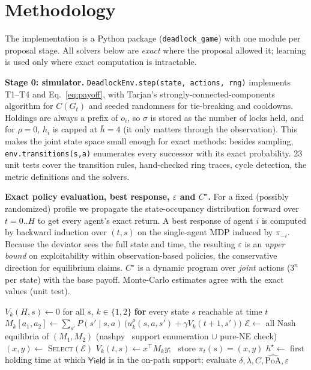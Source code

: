 \documentclass[10pt]{article}
\newcommand{\PoAhat}{\widehat{\mathrm{PoA}}}
\newcommand{\Yield}{\textsf{Yield}}
\begin{document}
\section{Methodology}\label{sec:method}
The implementation is a Python package (\texttt{deadlock\_game}) with one module per proposal stage. All solvers below
are \emph{exact} where the proposal allowed it; learning is used only where exact computation is intractable.

\textbf{Stage 0: simulator.} \texttt{DeadlockEnv.step(state, actions, rng)} implements T1--T4 and Eq.~\eqref{eq:payoff},
with Tarjan's strongly-connected-components algorithm for $C(G_t)$ and seeded randomness for tie-breaking and cooldowns.
Holdings are always a prefix of $o_i$, so $\sigma$ is stored as the number of locks held, and for $\rho=0$, $h_i$ is capped
at $\bar h=4$ (it only matters through the observation). This makes the joint state space small enough for exact
methods: besides sampling, \texttt{env.transitions(s,a)} enumerates every successor with its exact probability.
23 unit tests cover the transition rules, hand-checked ring traces, cycle detection, the metric definitions and the solvers.

\textbf{Exact policy evaluation, best response, $\varepsilon$ and $C^\star$.} For a fixed (possibly randomized) profile
we propagate the state-occupancy distribution forward over $t=0..H$ to get every agent's exact return. A best response of
agent $i$ is computed by backward induction over $(t,s)$ on the single-agent MDP induced by $\pi_{-i}$. Because the
deviator sees the full state and time, the resulting $\varepsilon$ is an \emph{upper bound} on exploitability within
observation-based policies, the conservative direction for equilibrium claims. $C^\star$ is a dynamic program over
\emph{joint} actions ($3^n$ per state) with the base payoff. Monte-Carlo estimates agree with the exact values (unit test).

\begin{algorithm}[t]
\caption{Stage 1: subgame-perfect equilibrium of the two-agent game by backward induction}\label{alg:spe}
\small
\begin{algorithmic}[1]
\State $V_k(H,s)\gets0$ for all $s$, $k\in\{1,2\}$
 \textbf{for} every state $s$ reachable at time $t$
  \State $M_k[a_1,a_2]\gets\sum_{s'}P(s'\mid s,a)\,\bigl(u^\rho_k(s,a,s')+\gamma V_k(t{+}1,s')\bigr)$ 
  \State $\mathcal E\gets$ all Nash equilibria of $(M_1,M_2)$ (nashpy~\cite{knight} support enumeration $\cup$ pure-NE check)
  \State $(x,y)\gets$ \textsc{Select}$(\mathcal E)$ 
  \State $V_k(t,s)\gets x^\top M_k y$; \ store $\pi_t(s)=(x,y)$
\EndFor
\State $h^\star\gets$ first holding time at which $\Yield$ is in the on-path support; evaluate $\delta,\lambda,C,\PoAhat,\varepsilon$
\end{algorithmic}
\end{algorithm}
\end{document}

